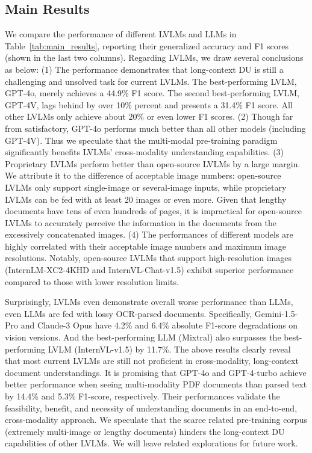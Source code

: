 \subsection{Main Results}
We compare the performance of different LVLMs and LLMs in Table~\ref{tab:main_results}, reporting their generalized accuracy and F1 scores (shown in the last two columns). Regarding LVLMs, we draw several conclusions as below: (1) The performance demonstrates that long-context DU is still a challenging and unsolved task for current LVLMs. The best-performing LVLM, GPT-4o, merely achieves a 44.9\% F1 score. The second best-performing LVLM, GPT-4V, lags behind by over 10\% percent and presents a 31.4\% F1 score. All other LVLMs only achieve about 20\% or even lower F1 scores. (2) Though far from satisfactory, GPT-4o performs much better than all other models (including GPT-4V). Thus we speculate that the multi-modal pre-training paradigm significantly benefits LVLMs' cross-modality understanding capabilities. (3) Proprietary LVLMs perform better than open-source LVLMs by a large margin. We attribute it to the difference of acceptable image numbers: open-source LVLMs only support single-image or several-image
inputs, while proprietary LVLMs can be fed with at least 20 images or even more. Given that lengthy documents have tens of even hundreds of pages, it is impractical for open-source LVLMs to accurately perceive the information in the documents from the excessively concatenated images. (4) The performances of different models are highly correlated with their acceptable image numbers and maximum image resolutions. Notably, open-source LVLMs that support high-resolution images (\ie InternLM-XC2-4KHD and InternVL-Chat-v1.5) exhibit superior performance compared to those with lower resolution limits.

Surprisingly, LVLMs even demonstrate overall worse performance than LLMs, even LLMs are fed with lossy OCR-parsed documents. Specifically, Gemini-1.5-Pro and Claude-3 Opus have 4.2\% and 6.4\% absolute F1-score degradations on vision versions. And the best-performing LLM (Mixtral) also surpasses the best-performing LVLM (InternVL-v1.5) by 11.7\%. The above results clearly reveal that most current LVLMs are still not proficient in cross-modality, long-context document understandings. It is promising that GPT-4o and GPT-4-turbo achieve better performance when seeing multi-modality PDF documents than parsed text by 14.4\% and 5.3\% F1-score, respectively. Their performances validate the feasibility, benefit, and necessity of understanding documents in an end-to-end, cross-modality approach. We speculate that the scarce related pre-training corpus (\ie extremely multi-image or lengthy documents) hinders the long-context DU capabilities of other LVLMs. We will leave related explorations for future work.

